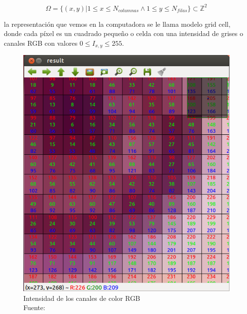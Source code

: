         \begin{equation}
            \Omega = \{(x, y)| 1 \leq x \leq N_{columnas} \land 1 \leq y \leq N_{filas}\} \subset \mathbb{Z}^2
        \end{equation}
        
        la representación que vemos en la computadora se le llama modelo grid cell, donde cada píxel es un cuadrado pequeño o celda con una intensidad de grises o canales RGB \citep{10.5555/2584519} con valores $0 \leq I_{x, y} \leq 255$.

        \begin{figure}[H]
            \centering
            \includegraphics[scale=0.25]{imagenes/pixels}
            \caption{Intensidad de los canales de color RGB\\ Fuente: \citep{montabone_2012}}
        \end{figure}
